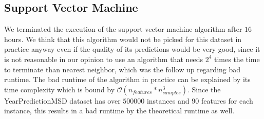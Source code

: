 \subsection{Support Vector Machine}
We terminated the execution of the support vector machine algorithm after $16$ hours. We think that this algorithm would not be picked for this dataset in practice anyway even if the quality of its predictions would be very good, since it is not reasonable in our opinion to use an algorithm that needs $2^4$ times the time to terminate than nearest neighbor, which was the follow up regarding bad runtime.
The bad runtime of the algorithm in practice can be explained by its time complexity which is bound by $\mathcal{O}(n_{features}*n_{samples}^3)$. Since the YearPredictionMSD dataset has over $500000$ instances and $90$ features for each instance, this results in a bad runtime by the theoretical runtime as well.
